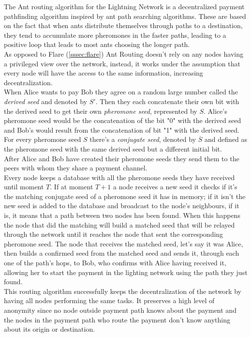 The Ant routing algorithm for the Lightning Network \cite{ant_routing} is a decentralized payment pathfinding algorithm inspired by ant path searching algorithms. These are based on the fact that when ants distribute themselves through paths to a destination, they tend to accumulate more pheromones in the faster paths, leading to a positive loop that leads to most ants choosing the longer path.\\
As opposed to Flare (\ref{sssec:flare}) Ant Routing doesn't rely on any nodes having a privileged view over the network, instead, it works under the assumption that every node will have the access to the same information, increasing decentralization. \\
When Alice wants to pay Bob they agree on a random large number called the \textit{derived seed} and denoted by $S'$. Then they each concatenate their own bit with the derived seed to get their own \textit{pheromone seed}, represented by $S$. Alice's pheromone seed would be the concatenation of the bit "0" with the derived seed and Bob's would result from the concatenation of bit "1" with the derived seed. 
For every pheromone seed $S$ there's a \textit{conjugate seed}, denoted by $\overline{S}$ and defined as the pheromone seed with the same derived seed but a different initial bit.\\
After Alice and Bob have created their pheromone seeds they send them to the peers with whom they share a payment channel. \\
Every node keeps a database with all the pheromone seeds they have received until moment $T$. If at moment $T+1$ a node receives a new seed it checks if it's the matching conjugate seed of a pheromone seed it has in memory; if it isn't the new seed is added to the database and broadcast to the node's neighbours, if it is, it means that a path between two nodes has been found. When this happens the node that did the matching will build a matched seed that will be relayed through the network until it reaches the node that sent the corresponding pheromone seed. The node that receives the matched seed, let's say it was Alice, then builds a confirmed seed from the matched seed and sends it, through each one of the path's hops, to Bob, who confirms with Alice having received it, allowing her to start the payment in the lighting network using the path they just found. \\
This routing algorithm successfully keeps the decentralization of the network by having all nodes performing the same tasks. It preserves a high level of anonymity since no node outside payment path knows about the payment and the nodes in the payment path who route the payment don't know anything about its origin or destination. \\
